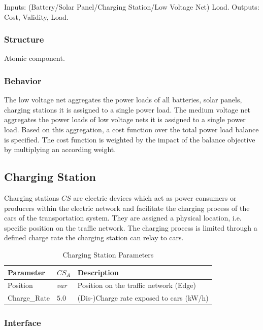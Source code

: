 Inputs: (Battery/Solar Panel/Charging Station/Low Voltage Net) Load. Outputs: Cost, Validity, Load.

\subsubsection{Structure}

Atomic component.

\subsubsection{Behavior}

The low voltage net aggregates the power loads of all batteries, solar panels, charging stations it is assigned to a single power load. The medium voltage net aggregates the power loads of low voltage nets it is assigned to a single power load. Based on this aggregation, a cost function over the total power load balance is specified. The cost function is weighted by the impact of the balance objective by multiplying an according weight.

\subsection{Charging Station}
Charging stations $CS$ are electric devices which act as power consumers or producers within the electric network and facilitate the charging process of the cars of the transportation system. They are assigned a physical location, i.e. specific position on the traffic network. The charging process is limited through a defined charge rate the charging station can relay to cars.

\begin{table}[h]
	\renewcommand{\arraystretch}{1.3}
	\caption{Charging Station Parameters}
	\centering
	\begin{tabular}{lll}
		\hline
		\textbf{Parameter}      & \textbf{$CS_{A}$} & \textbf{Description} \\ \hline
		Position      			& $var$ & Position on the traffic network (Edge) \\  
		Charge\_Rate        	& $5.0$ & (Dis-)Charge rate exposed to cars (kW/h)     \\ \hline
	\end{tabular}
\end{table}

\subsubsection{Interface}

